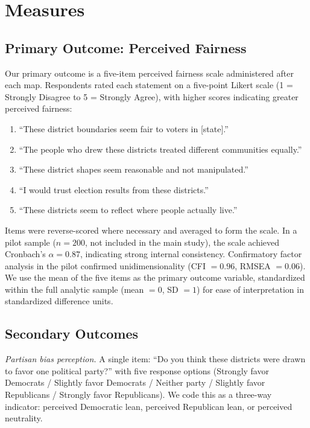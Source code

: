 \section{Measures}
\label{sec:measures}

\subsection{Primary Outcome: Perceived Fairness}

Our primary outcome is a five-item perceived fairness scale administered after each map. Respondents rated each statement on a five-point Likert scale (1 = Strongly Disagree to 5 = Strongly Agree), with higher scores indicating greater perceived fairness:

\begin{enumerate}
    \item ``These district boundaries seem fair to voters in [state].''
    \item ``The people who drew these districts treated different communities equally.''
    \item ``These district shapes seem reasonable and not manipulated.''
    \item ``I would trust election results from these districts.''
    \item ``These districts seem to reflect where people actually live.''
\end{enumerate}

Items were reverse-scored where necessary and averaged to form the scale. In a pilot sample ($n = 200$, not included in the main study), the scale achieved Cronbach's $\alpha = 0.87$, indicating strong internal consistency. Confirmatory factor analysis in the pilot confirmed unidimensionality (CFI $= 0.96$, RMSEA $= 0.06$). We use the mean of the five items as the primary outcome variable, standardized within the full analytic sample (mean $= 0$, SD $= 1$) for ease of interpretation in standardized difference units.

\subsection{Secondary Outcomes}

\textit{Partisan bias perception.} A single item: ``Do you think these districts were drawn to favor one political party?'' with five response options (Strongly favor Democrats / Slightly favor Democrats / Neither party / Slightly favor Republicans / Strongly favor Republicans). We code this as a three-way indicator: perceived Democratic lean, perceived Republican lean, or perceived neutrality.


